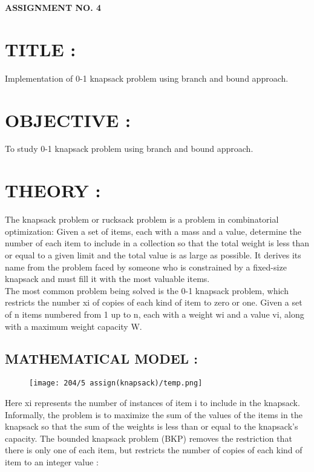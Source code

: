 \documentclass{article}
\begin{document}
	
	\begin{center}
		\textbf{\bfseries\Large ASSIGNMENT NO. 4}
		\\[1cm]
	\end{center}
	
	
	\section{TITLE : } Implementation of 0-1 knapsack problem using branch and bound approach.
	
	\section{OBJECTIVE : }  To study 0-1 knapsack problem using branch and bound approach.
	
	\section{THEORY : }
	
	The knapsack problem or rucksack problem is a problem in combinatorial optimization: Given a set of items, each with a mass and a value, determine the number of each item to include in a collection so that the total weight is less than or equal to a given limit and the total value is as large as possible. It derives its name from the problem faced by someone who is constrained by a fixed-size knapsack and must fill it with the most valuable items.\\
	The most common problem being solved is the 0-1 knapsack problem, which restricts the number xi of copies of each kind of item to zero or one. Given a set of n items numbered from 1 up to n, each with a weight wi and a value vi, along with a maximum weight capacity W.\\
	
	\subsection{MATHEMATICAL MODEL : }
	
	\begin{figure}[h!]
		\centering
		\texttt{[image: 204/5 assign(knapsack)/temp.png]}
	\end{figure}
	
	Here xi represents the number of instances of item i to include in the knapsack. Informally, the problem is to maximize the sum of the values of the items in the knapsack so that the sum of the weights is less than or equal to the knapsack's capacity.
	The bounded knapsack problem (BKP) removes the restriction that there is only one of each item, but restricts the number  of copies of each kind of item to an integer value  :\\
	
\end{document}
